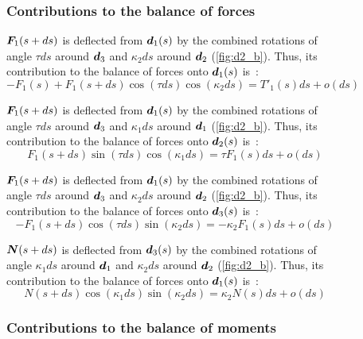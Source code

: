 \begin{figure}[p]
	\begin{fullpage}
	\subsubsection{Contributions to the balance of forces}
	\vspace{10pt}
	
	$\boldsymbol{F}_1(s+ds)$ is deflected from $\boldsymbol{d}_1(s)$ by the combined rotations of angle $\tau ds$ around $\boldsymbol{d}_3$ and $\kappa_2 ds$ around $\boldsymbol{d}_2$ (\cref{fig:d2_b}). Thus, its contribution to the balance of forces onto $\boldsymbol{d}_1(s)$ is~: 
	\begin{equation*}
		-F_1(s) + F_1(s+ds) \cos(\tau ds) \cos(\kappa_2 ds) = T'_1 (s) ds + o(ds)
	\end{equation*}
	
	$\boldsymbol{F}_1(s+ds)$ is deflected from $\boldsymbol{d}_1(s)$ by the combined rotations of angle $\tau ds$ around $\boldsymbol{d}_3$ and $\kappa_1 ds$ around $\boldsymbol{d}_1$ (\cref{fig:d2_b}). Thus, its contribution to the balance of forces onto $\boldsymbol{d}_2(s)$ is~: 
	\begin{equation*}
		F_1(s+ds) \sin(\tau ds) \cos(\kappa_1 ds) = \tau F_1 (s) ds + o(ds)
	\end{equation*}	
	
	$\boldsymbol{F}_1(s+ds)$ is deflected from $\boldsymbol{d}_1(s)$ by the combined rotations of angle $\tau ds$ around $\boldsymbol{d}_3$ and $\kappa_2 ds$ around $\boldsymbol{d}_2$ (\cref{fig:d2_b}). Thus, its contribution to the balance of forces onto $\boldsymbol{d}_3(s)$ is~: 
	\begin{equation*}
		-F_1(s+ds) \cos(\tau ds) \sin(\kappa_2 ds) = - \kappa_2 F_1(s) ds + o(ds)
	\end{equation*}	
	
	$\boldsymbol{N}(s+ds)$ is deflected from $\boldsymbol{d}_3(s)$ by the combined rotations of angle $\kappa_1 ds$ around $\boldsymbol{d}_1$ and $\kappa_2 ds$ around $\boldsymbol{d}_2$ (\cref{fig:d2_b}). Thus, its contribution to the balance of forces onto $\boldsymbol{d}_1(s)$ is~: 
	\begin{equation*}
		N(s+ds) \cos(\kappa_1 ds) \sin(\kappa_2 ds) = \kappa_2 N(s) ds + o(ds)
	\end{equation*}
	\vspace{10pt}

	\subsubsection{Contributions to the balance of moments}
	\vspace{10pt}
	

\end{fullpage}
\end{figure}
